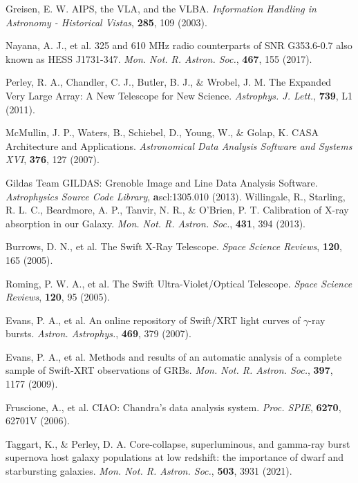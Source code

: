 \documentclass{nature_plusfigure}
\newcommand{\mn}{{Mon. Not. R. Astron. Soc.}}
\newcommand{\mnras}{\mn}
\newcommand{\apjl}{{Astrophys. J. Lett.}}
\newcommand{\aap}{{Astron. Astrophys.}}
\newcommand{\procspie}{Proc. SPIE}
\newcommand{\ssr}{Space Science Reviews}
\begin{document}
\begin{methods}
\begin{thebibliography}{10}

  Greisen, E. W. AIPS, the VLA, and the VLBA. \emph{Information Handling in Astronomy - Historical Vistas}, \textbf{285}, 109 (2003). 

 Nayana, A. J., et al. 325 and 610 MHz radio counterparts of SNR G353.6-0.7 also known as HESS J1731-347. \emph{\mnras}, \textbf{467}, 155 (2017). 

 Perley, R. A., Chandler, C. J., Butler, B. J., \& Wrobel, J. M. The Expanded Very Large Array: A New Telescope for New Science. \emph{\apjl}, \textbf{739}, L1 (2011). 

 McMullin, J. P., Waters, B., Schiebel, D., Young, W., \& Golap, K. CASA Architecture and Applications. \emph{Astronomical Data Analysis Software and Systems XVI}, \textbf{376}, 127 (2007). 

 Gildas Team GILDAS: Grenoble Image and Line Data Analysis Software. \emph{Astrophysics Source Code Library}, \textbf ascl:1305.010 (2013). 
 Willingale, R., Starling, R. L. C., Beardmore, A. P., Tanvir, N. R., \& O'Brien, P. T. Calibration of X-ray absorption in our Galaxy. \emph{\mnras}, \textbf{431}, 394 (2013). 


 Burrows, D. N., et al. The Swift X-Ray Telescope. \emph{\ssr}, \textbf{120}, 165 (2005). 

 Roming, P. W. A., et al. The Swift Ultra-Violet/Optical Telescope. \emph{\ssr}, \textbf{120}, 95 (2005).

 Evans, P. A., et al. An online repository of Swift/XRT light curves of $\gamma$-ray bursts. \emph{\aap}, \textbf{469}, 379 (2007). 

 Evans, P. A., et al. Methods and results of an automatic analysis of a complete sample of Swift-XRT observations of GRBs. \emph{\mnras}, \textbf{397}, 1177 (2009). 

 Fruscione, A., et al. CIAO: Chandra's data analysis system. \emph{\procspie}, \textbf{6270}, 62701V (2006). 


 Taggart, K., \& Perley, D. A. Core-collapse, superluminous, and gamma-ray burst supernova host galaxy populations at low redshift: the importance of dwarf and starbursting galaxies. \emph{\mnras}, \textbf{503}, 3931 (2021). 



\end{thebibliography}
\end{methods}
\end{document}
